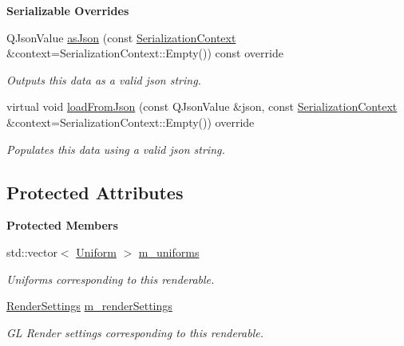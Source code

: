 \begin{Indent}\textbf{ Serializable Overrides}\par
\begin{DoxyCompactItemize}
\item 
\mbox{\label{classrev_1_1_shadable_a8f0a38951d1cd43a853419a4bcb3b52e}} 
Q\+Json\+Value \mbox{\hyperlink{classrev_1_1_shadable_a8f0a38951d1cd43a853419a4bcb3b52e}{as\+Json}} (const \mbox{\hyperlink{structrev_1_1_serialization_context}{Serialization\+Context}} \&context=Serialization\+Context\+::\+Empty()) const override
\begin{DoxyCompactList}\small\item\em Outputs this data as a valid json string. \end{DoxyCompactList}\item 
\mbox{\label{classrev_1_1_shadable_a55a0ec592c4ab572a4edad5a306cc273}} 
virtual void \mbox{\hyperlink{classrev_1_1_shadable_a55a0ec592c4ab572a4edad5a306cc273}{load\+From\+Json}} (const Q\+Json\+Value \&json, const \mbox{\hyperlink{structrev_1_1_serialization_context}{Serialization\+Context}} \&context=Serialization\+Context\+::\+Empty()) override
\begin{DoxyCompactList}\small\item\em Populates this data using a valid json string. \end{DoxyCompactList}\end{DoxyCompactItemize}
\end{Indent}
\subsection*{Protected Attributes}
\begin{Indent}\textbf{ Protected Members}\par
\begin{DoxyCompactItemize}
\item 
\mbox{\label{classrev_1_1_shadable_ab0c12add1777dd42f68c3fdb6bc6069d}} 
std\+::vector$<$ \mbox{\hyperlink{structrev_1_1_uniform}{Uniform}} $>$ \mbox{\hyperlink{classrev_1_1_shadable_ab0c12add1777dd42f68c3fdb6bc6069d}{m\+\_\+uniforms}}
\begin{DoxyCompactList}\small\item\em Uniforms corresponding to this renderable. \end{DoxyCompactList}\item 
\mbox{\label{classrev_1_1_shadable_ab1ae3f26308c6c4ff8175e6c3d3399d5}} 
\mbox{\hyperlink{classrev_1_1_render_settings}{Render\+Settings}} \mbox{\hyperlink{classrev_1_1_shadable_ab1ae3f26308c6c4ff8175e6c3d3399d5}{m\+\_\+render\+Settings}}
\begin{DoxyCompactList}\small\item\em GL Render settings corresponding to this renderable. \end{DoxyCompactList}\end{DoxyCompactItemize}
\end{Indent}
